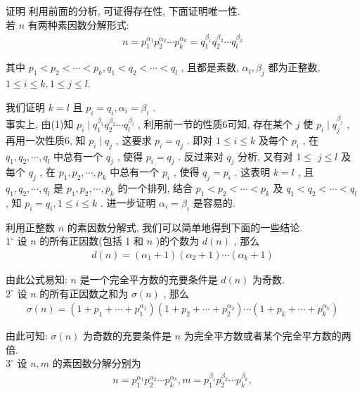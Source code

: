 证明 利用前面的分析, 可证得存在性, 下面证明唯一性. \\
若 $n$ 有两种素因数分解形式:
\begin{align*}
	n=p_{1}^{\alpha_{1}} p_{2}^{\alpha_{2}} \cdots p_{k}^{\alpha_{k}}=q_{1}^{\beta_{1}} q_{2}^{\beta_{2}} \cdots q_{l}^{\beta_{2}}
\end{align*}

其中 $p_{1}<p_{2}<\cdots<p_{k}, q_{1}<q_{2}<\cdots<q_{l}$ , 且都是素数,  $\alpha_{i} ,  \beta_{j}$ 都为正整数,  $1 \leqslant i \leqslant k, 1 \leqslant j \leqslant l$.

我们证明 $k=l$ 且 $p_{i}=q_{i}, \alpha_{i}=\beta_{i}$ . \\
事实上, 由(1)知 $p_{i} \mid q_{1}^{\beta_{1}} q_{2}^{\beta_{2}} \cdots q_{l}^{\beta_{l}}$ , 利用前一节的性质6可知, 存在某个 $j$ 使 $p_{i} \mid q_{j}^{\beta_{j}}$ , 再用一次性质6, 知 $p_{i} \mid q_{j}$ , 这要求 $p_{i}=q_{j}$ . 即对 $1 \leqslant i \leqslant k$ 及每个 $p_{i}$ , 在 $q_{1}, q_{2}, \cdots, q_{l}$ 中总有一个 $q_{j}$ , 使得 $p_{i}=q_{j}$ . 反过来对 $q_{j}$ 分析, 又有对 $1 \leqslant$ $j \leqslant l$ 及每个 $q_{j}$ , 在 $p_{1}, p_{2}, \cdots, p_{k}$ 中总有一个 $p_{i}$ , 使得 $q_{j}=p_{i}$ . 这表明 $k=l$ , 且 $q_{1}, q_{2}, \cdots, q_{l}$ 是 $p_{1}, p_{2}, \cdots, p_{k}$ 的一个排列, 结合 $p_{1}<p_{2}<\cdots<p_{k}$ 及 $q_{1}<q_{2}<\cdots<q_{l}$ , 知 $p_{i}=q_{i}, 1 \leqslant i \leqslant k$ . 进一步证明 $\alpha_{i}=\beta_{i}$ 是容易的.

利用正整数 $n$ 的素因数分解式, 我们可以简单地得到下面的一些结论. \\
$1^{\circ}$ 设 $n$ 的所有正因数(包括 1 和 $n$ )的个数为 $d(n)$ , 那么
\begin{align*}
	d(n)=\left(\alpha_{1}+1\right)\left(\alpha_{2}+1\right) \cdots\left(\alpha_{k}+1\right)
\end{align*}

由此公式易知: $n$ 是一个完全平方数的充要条件是 $d(n)$ 为奇数. \\
$2^{\circ}$ 设 $n$ 的所有正因数之和为 $\sigma(n)$ , 那么
\begin{align*}
	\sigma(n)=\left(1+p_{1}+\cdots+p_{1}^{\alpha_{1}}\right)\left(1+p_{2}+\cdots+p_{2}^{\alpha_{2}}\right) \cdots\left(1+p_{k}+\cdots+p_{k}^{\alpha_{k}}\right)
\end{align*}

由此可知:  $\sigma(n)$ 为奇数的充要条件是 $n$ 为完全平方数或者某个完全平方数的两倍. \\
$3^{\circ}$ 设 $n ,  m$ 的素因数分解分别为
\begin{align*}
	n=p_{1}^{\alpha_{1}} p_{2}^{\alpha_{2}} \cdots p_{k}^{\alpha_{k}}, m=p_{1}^{\beta_{1}} p_{2}^{\beta_{2}} \cdots p_{k}^{\beta_{k}},
\end{align*}

